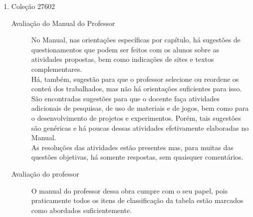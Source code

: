 \documentclass[a4paper, 12pt]{article}
\begin{document}
\begin{enumerate}
\begin{enumerate}
    \item Coleção 27602
      \begin{description}
      \item[Avaliação do Manual do Professor] 
        No Manual, nas orientações específicas por capítulo, há sugestões de questionamentos que podem ser feitos com os alunos sobre as atividades propostas, bem como indicações de sites e textos complementares. \\
        Há, também, sugestão para que o professor selecione ou reordene os conteú dos trabalhados, mas não há orientações suficientes para isso. \\
        São  encontradas  sugestões  para  que  o  docente  faça  atividades  adicionais de pesquisas,  de  uso  de  materiais  e  de  jogos,  bem  como  para  o  desenvolvimento  de projetos  e  experimentos.  Porém,  tais  sugestões  são  genéricas  e  há  poucas  dessas atividades efetivamente elaboradas no Manual.\\
        As  resoluções  das  atividades  estão  presentes  mas,  para  muitas  das  questões objetivas, há somente respostas, sem quaisquer comentários.
      \item[Avaliação do professor]
        O manual do professor dessa obra cumpre com o seu papel, pois praticamente todos os itens de classificação da tabela estão marcados como abordados suficientemente.
      \end{description}
      
    \end{enumerate}
  \end{enumerate}
\end{document}

